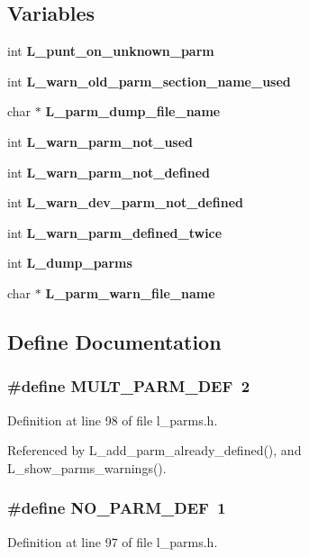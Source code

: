\subsection*{Variables}
\begin{CompactItemize}
\item 
int \bf{L\_\-punt\_\-on\_\-unknown\_\-parm}
\item 
int \bf{L\_\-warn\_\-old\_\-parm\_\-section\_\-name\_\-used}
\item 
char $\ast$ \bf{L\_\-parm\_\-dump\_\-file\_\-name}
\item 
int \bf{L\_\-warn\_\-parm\_\-not\_\-used}
\item 
int \bf{L\_\-warn\_\-parm\_\-not\_\-defined}
\item 
int \bf{L\_\-warn\_\-dev\_\-parm\_\-not\_\-defined}
\item 
int \bf{L\_\-warn\_\-parm\_\-defined\_\-twice}
\item 
int \bf{L\_\-dump\_\-parms}
\item 
char $\ast$ \bf{L\_\-parm\_\-warn\_\-file\_\-name}
\end{CompactItemize}


\subsection{Define Documentation}
\subsubsection{\setlength{\rightskip}{0pt plus 5cm}\#define MULT\_\-PARM\_\-DEF~2}\label{l__parms_8h_ff975a5d378618007dae543fd5fcd62c}




Definition at line 98 of file l\_\-parms.h.

Referenced by L\_\-add\_\-parm\_\-already\_\-defined(), and L\_\-show\_\-parms\_\-warnings().
\subsubsection{\setlength{\rightskip}{0pt plus 5cm}\#define NO\_\-PARM\_\-DEF~1}\label{l__parms_8h_00276916caee27ce77b97bd174a6dc16}




Definition at line 97 of file l\_\-parms.h.

